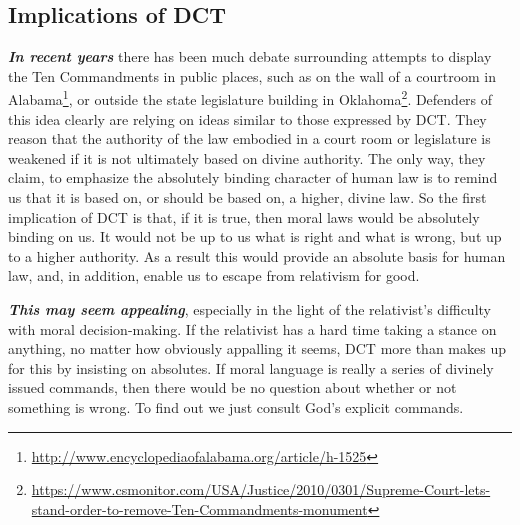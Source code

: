 \documentclass[
  12pt, openany]{book}
\renewcommand{\href}[2]{#2\footnote{\url{#1}}}
\theoremstyle{definition}
\theoremstyle{definition}
\theoremstyle{definition}
\theoremstyle{remark}
\begin{document}
\hypertarget{implications-of-dct}{%
\subsection*{Implications of DCT}\label{implications-of-dct}}


\textbf{\emph{In recent years}} there has been much debate surrounding attempts to display the Ten Commandments in public places, such as on the \href{http://www.encyclopediaofalabama.org/article/h-1525}{wall of a courtroom in Alabama}, or outside the state legislature building in \href{https://www.csmonitor.com/USA/Justice/2010/0301/Supreme-Court-lets-stand-order-to-remove-Ten-Commandments-monument}{Oklahoma}. Defenders of this idea clearly are relying on ideas similar to those expressed by DCT. They reason that the authority of the law embodied in a court room or legislature is weakened if it is not ultimately based on divine authority. The only way, they claim, to emphasize the absolutely binding character of human law is to remind us that it is based on, or should be based on, a higher, divine law. So the first implication of DCT is that, if it is true, then moral laws would be absolutely binding on us. It would not be up to us what is right and what is wrong, but up to a higher authority. As a result this would provide an absolute basis for human law, and, in addition, enable us to escape from relativism for good.

\textbf{\emph{This may seem appealing}}, especially in the light of the relativist's difficulty with moral decision-making. If the relativist has a hard time taking a stance on anything, no matter how obviously appalling it seems, DCT more than makes up for this by insisting on absolutes. If moral language is really a series of divinely issued commands, then there would be no question about whether or not something is wrong. To find out we just consult God's explicit commands.
\end{document}

